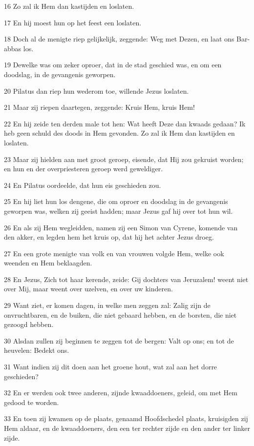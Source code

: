 \par 16 Zo zal ik Hem dan kastijden en loslaten.
\par 17 En hij moest hun op het feest een loslaten.
\par 18 Doch al de menigte riep gelijkelijk, zeggende: Weg met Dezen, en laat ons Bar-abbas los.
\par 19 Dewelke was om zeker oproer, dat in de stad geschied was, en om een doodslag, in de gevangenis geworpen.
\par 20 Pilatus dan riep hun wederom toe, willende Jezus loslaten.
\par 21 Maar zij riepen daartegen, zeggende: Kruis Hem, kruis Hem!
\par 22 En hij zeide ten derden male tot hen: Wat heeft Deze dan kwaads gedaan? Ik heb geen schuld des doods in Hem gevonden. Zo zal ik Hem dan kastijden en loslaten.
\par 23 Maar zij hielden aan met groot geroep, eisende, dat Hij zou gekruist worden; en hun en der overpriesteren geroep werd geweldiger.
\par 24 En Pilatus oordeelde, dat hun eis geschieden zou.
\par 25 En hij liet hun los dengene, die om oproer en doodslag in de gevangenis geworpen was, welken zij geeist hadden; maar Jezus gaf hij over tot hun wil.
\par 26 En als zij Hem wegleidden, namen zij een Simon van Cyrene, komende van den akker, en legden hem het kruis op, dat hij het achter Jezus droeg.
\par 27 En een grote menigte van volk en van vrouwen volgde Hem, welke ook weenden en Hem beklaagden.
\par 28 En Jezus, Zich tot haar kerende, zeide: Gij dochters van Jeruzalem! weent niet over Mij, maar weent over uzelven, en over uw kinderen.
\par 29 Want ziet, er komen dagen, in welke men zeggen zal: Zalig zijn de onvruchtbaren, en de buiken, die niet gebaard hebben, en de borsten, die niet gezoogd hebben.
\par 30 Alsdan zullen zij beginnen te zeggen tot de bergen: Valt op ons; en tot de heuvelen: Bedekt ons.
\par 31 Want indien zij dit doen aan het groene hout, wat zal aan het dorre geschieden?
\par 32 En er werden ook twee anderen, zijnde kwaaddoeners, geleid, om met Hem gedood te worden.
\par 33 En toen zij kwamen op de plaats, genaamd Hoofdschedel plaats, kruisigden zij Hem aldaar, en de kwaaddoeners, den een ter rechter zijde en den ander ter linker zijde.
